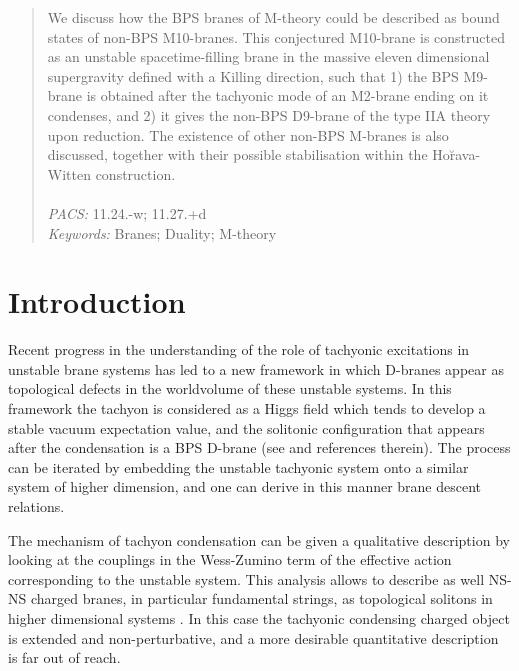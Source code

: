 \documentclass[12pt,a4paper]{article}
\begin{document}
\begin{quotation}

\small

We discuss how the BPS branes of M-theory could be
described as bound states of non-BPS M10-branes.
This conjectured M10-brane is constructed as an unstable spacetime-filling
brane in the massive eleven dimensional supergravity defined with a Killing 
direction, such that 1) the BPS M9-brane is obtained after the tachyonic mode 
of an M2-brane
ending on it condenses, and 2) it
gives the non-BPS D9-brane of the type IIA theory upon reduction. 
The existence of other non-BPS M-branes is also discussed, together
with their possible stabilisation within the Ho\u{r}ava-Witten 
construction.\\
\\
{\it PACS:} 11.24.-w; 11.27.+d\\
{\it Keywords:} Branes; Duality; M-theory


\end{quotation}


\vspace{1cm}


\newpage

\pagestyle{plain}






\section{Introduction}

Recent progress in the understanding of the role of tachyonic
excitations in unstable brane systems has led to a new
framework in which D-branes appear
as topological defects in the worldvolume of these unstable
systems.  
In this framework the tachyon is considered as a Higgs field which 
tends to develop a stable
vacuum expectation value, and the solitonic configuration that
appears after the condensation is a BPS D-brane (see \cite{reva} 
and references therein). The process can be
iterated by embedding the unstable tachyonic system onto a similar
system of higher dimension, and one can derive in this manner 
brane descent relations.

The mechanism of tachyon condensation can be given a qualitative
description by looking at the couplings in the Wess-Zumino term of
the effective action corresponding to the unstable system. This
analysis allows to describe as well NS-NS charged branes, in particular
fundamental strings, as topological solitons in higher dimensional
systems \cite{Yi,HL1}. In this case
the tachyonic condensing charged object is extended and
non-perturbative, and a more desirable quantitative description is far
out of reach.
\end{document}

